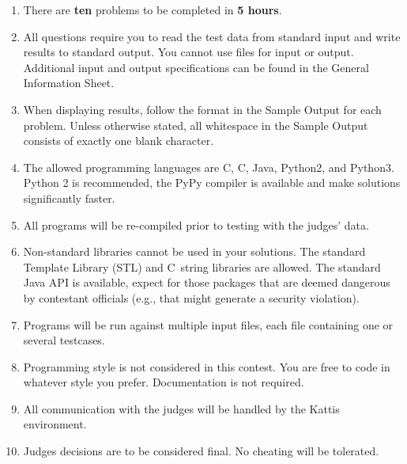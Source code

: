 \documentclass{article}
\newcommand{\CPP}{C\nolinebreak\hspace{-.05em}\raisebox{.4ex}{\tiny\bf +}\nolinebreak\hspace{-.10em}\raisebox{.4ex}{\tiny\bf +}}
\begin{document}
\begin{enumerate}[label=\arabic*.]
	\item There are \textbf{ten} problems to be completed in \textbf{5 hours}.
	\item All questions require you to read the test data from standard input and write results to standard output. You cannot use files for input or output. Additional input and output specifications can be found in the General Information Sheet.
	\item When displaying results, follow the format in the Sample Output for each problem. Unless otherwise stated, all whitespace in the Sample Output consists of exactly one blank character.
	\item The allowed programming languages are C, \CPP, Java, Python2, and Python3. Python 2 is recommended, the PyPy compiler is available and make solutions significantly faster. 
	\item All programs will be re-compiled prior to testing with the judges’ data.
	\item	Non-standard libraries cannot be used in your solutions. The standard Template Library (STL) and \CPP \, string libraries are allowed. The standard Java API is available, expect for those packages that are deemed dangerous by contestant officials (e.g., that might generate a security violation).
	\item	Programs will be run against multiple input files, each file containing one or several testcases. 
	\item Programming style is not considered in this contest. You are free to code in whatever style you prefer. Documentation is not required.
	\item	All communication with the judges will be handled by the Kattis environment.
	\item Judges decisions are to be considered final. No cheating will be tolerated. 
	
\end{enumerate}
\end{document}
